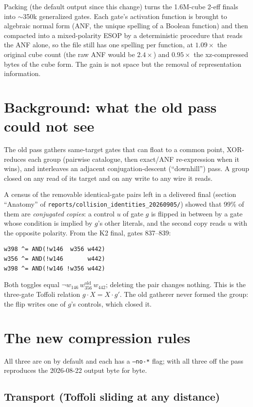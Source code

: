 \documentclass[11pt]{article}
\begin{document}
Packing (the default output since this change) turns the 1.6M-cube 2-eff finals into
$\sim$350k generalized gates. Each gate's activation function is brought to algebraic normal
form (ANF, the unique spelling of a Boolean function) and then compacted into a mixed-polarity
ESOP by a deterministic procedure that reads the ANF alone, so the file still has one spelling
per function, at $1.09\times$ the original cube count (the raw ANF would be $2.4\times$) and
$0.95\times$ the xz-compressed bytes of the cube form. The gain is not space but the removal
of representation information.

\section{Background: what the old pass could not see}

The old pass gathers same-target gates that can float to a common point, XOR-reduces each group
(pairwise catalogue, then exact/ANF re-expression when it wins), and interleaves an adjacent
conjugation-descent (``downhill'') pass. A group closed on any read of its target and on any
write to any wire it reads.

A census of the removable identical-gate pairs left in a delivered final (section
``Anatomy'' of \texttt{reports/collision\_identities\_20260905/}) showed that 99\% of them
are \emph{conjugated copies}: a control $u$ of gate $g$ is flipped in between by a gate whose
condition is implied by $g$'s other literals, and the second copy reads $u$ with the opposite
polarity. From the K2 final, gates 837--839:
\begin{verbatim}
w398 ^= AND(!w146  w356 w442)
w356 ^= AND(!w146       w442)
w398 ^= AND(!w146 !w356 w442)
\end{verbatim}
Both toggles equal $\lnot w_{146}\, w_{356}^{\text{old}}\, w_{442}$; deleting the pair changes
nothing. This is the three-gate Toffoli relation $g\cdot X = X\cdot g'$. The old gatherer
never formed the group: the flip writes one of $g$'s controls, which closed it.

\section{The new compression rules}

All three are on by default and each has a \texttt{--no-*} flag; with all three off the pass
reproduces the 2026-08-22 output byte for byte.

\subsection{Transport (Toffoli sliding at any distance)}
\end{document}
